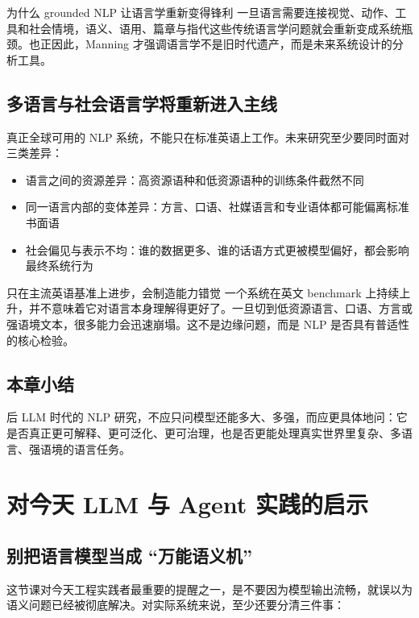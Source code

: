 \documentclass[a4paper]{article}
\begin{document}
\begin{knowledgebox}{为什么 grounded NLP 让语言学重新变得锋利}
一旦语言需要连接视觉、动作、工具和社会情境，语义、语用、篇章与指代这些传统语言学问题就会重新变成系统瓶颈。也正因此，Manning 才强调语言学不是旧时代遗产，而是未来系统设计的分析工具。
\end{knowledgebox}

\subsection{多语言与社会语言学将重新进入主线}

真正全球可用的 NLP 系统，不能只在标准英语上工作。未来研究至少要同时面对三类差异：

\begin{itemize}
    \item 语言之间的资源差异：高资源语种和低资源语种的训练条件截然不同
    \item 同一语言内部的变体差异：方言、口语、社媒语言和专业语体都可能偏离标准书面语
    \item 社会偏见与表示不均：谁的数据更多、谁的话语方式更被模型偏好，都会影响最终系统行为
\end{itemize}

\begin{warningbox}{只在主流英语基准上进步，会制造能力错觉}
一个系统在英文 benchmark 上持续上升，并不意味着它对语言本身理解得更好了。一旦切到低资源语言、口语、方言或强语境文本，很多能力会迅速崩塌。这不是边缘问题，而是 NLP 是否具有普适性的核心检验。
\end{warningbox}

\subsection{本章小结}

后 LLM 时代的 NLP 研究，不应只问模型还能多大、多强，而应更具体地问：它是否真正更可解释、更可泛化、更可治理，也是否更能处理真实世界里复杂、多语言、强语境的语言任务。

\section{对今天 LLM 与 Agent 实践的启示}

\subsection{别把语言模型当成 ``万能语义机''}

这节课对今天工程实践者最重要的提醒之一，是不要因为模型输出流畅，就误以为语义问题已经被彻底解决。对实际系统来说，至少还要分清三件事：
\end{document}
